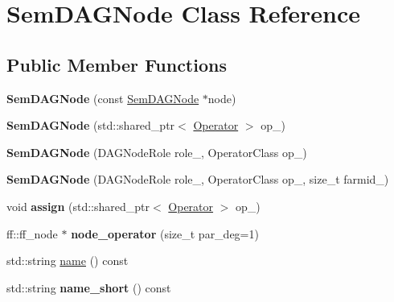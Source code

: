 \hypertarget{class_sem_d_a_g_node}{\section{\-Sem\-D\-A\-G\-Node \-Class \-Reference}
\label{class_sem_d_a_g_node}
}
\subsection*{\-Public \-Member \-Functions}
\begin{DoxyCompactItemize}
\item 
\hypertarget{class_sem_d_a_g_node_ada1470e0891b69c0b5ef47375df6f1eb}{{\bfseries \-Sem\-D\-A\-G\-Node} (const \hyperlink{class_sem_d_a_g_node}{\-Sem\-D\-A\-G\-Node} $\ast$node)}\label{class_sem_d_a_g_node_ada1470e0891b69c0b5ef47375df6f1eb}

\item 
\hypertarget{class_sem_d_a_g_node_aa4464f1e30cc1cb1d307abc7b3e04491}{{\bfseries \-Sem\-D\-A\-G\-Node} (std\-::shared\-\_\-ptr$<$ \hyperlink{class_operator}{\-Operator} $>$ op\-\_\-)}\label{class_sem_d_a_g_node_aa4464f1e30cc1cb1d307abc7b3e04491}

\item 
\hypertarget{class_sem_d_a_g_node_aca6ad5fd83da57766e0f0d0dbd303430}{{\bfseries \-Sem\-D\-A\-G\-Node} (\-D\-A\-G\-Node\-Role role\-\_\-, \-Operator\-Class op\-\_\-)}\label{class_sem_d_a_g_node_aca6ad5fd83da57766e0f0d0dbd303430}

\item 
\hypertarget{class_sem_d_a_g_node_aff57e8ea2a78f2d741b902809029cf86}{{\bfseries \-Sem\-D\-A\-G\-Node} (\-D\-A\-G\-Node\-Role role\-\_\-, \-Operator\-Class op\-\_\-, size\-\_\-t farmid\-\_\-)}\label{class_sem_d_a_g_node_aff57e8ea2a78f2d741b902809029cf86}

\item 
\hypertarget{class_sem_d_a_g_node_a378126db24a189d1c5c4e53466044200}{void {\bfseries assign} (std\-::shared\-\_\-ptr$<$ \hyperlink{class_operator}{\-Operator} $>$ op\-\_\-)}\label{class_sem_d_a_g_node_a378126db24a189d1c5c4e53466044200}

\item 
\hypertarget{class_sem_d_a_g_node_a205ba24b858d736d155cf4cc67477bec}{ff\-::ff\-\_\-node $\ast$ {\bfseries node\-\_\-operator} (size\-\_\-t par\-\_\-deg=1)}\label{class_sem_d_a_g_node_a205ba24b858d736d155cf4cc67477bec}

\item 
std\-::string \hyperlink{class_sem_d_a_g_node_a4b4318e6fb92342851d261ffcafc8431}{name} () const 
\item 
\hypertarget{class_sem_d_a_g_node_a2e6ee10ddc285d8de8012ee034b8bca9}{std\-::string {\bfseries name\-\_\-short} () const }\label{class_sem_d_a_g_node_a2e6ee10ddc285d8de8012ee034b8bca9}

\end{DoxyCompactItemize}
